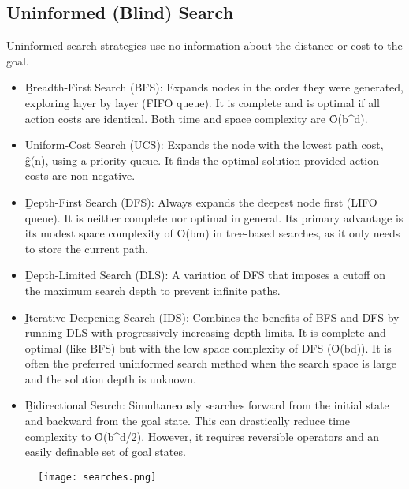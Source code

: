 \subsection{Uninformed (Blind) Search}
Uninformed search strategies use no information about the distance or cost to the goal.
\begin{itemize}
     \item \b{Breadth-First Search (BFS):} Expands nodes in the order they were generated, exploring layer by layer (FIFO queue). It is complete and is optimal if all action costs are identical. Both time and space complexity are \f{O(b^d)}.
     \item \b{Uniform-Cost Search (UCS):} Expands the node with the lowest path cost, \f{g(n)}, using a priority queue. It finds the optimal solution provided action costs are non-negative.
     \item \b{Depth-First Search (DFS):} Always expands the deepest node first (LIFO queue). It is neither complete nor optimal in general. Its primary advantage is its modest space complexity of \f{O(bm)} in tree-based searches, as it only needs to store the current path.
     \item \b{Depth-Limited Search (DLS):} A variation of DFS that imposes a cutoff on the maximum search depth to prevent infinite paths.
     \item \b{Iterative Deepening Search (IDS):} Combines the benefits of BFS and DFS by running DLS with progressively increasing depth limits. It is complete and optimal (like BFS) but with the low space complexity of DFS (\f{O(bd)}). It is often the preferred uninformed search method when the search space is large and the solution depth is unknown.
     \item \b{Bidirectional Search:} Simultaneously searches forward from the initial state and backward from the goal state. This can drastically reduce time complexity to \f{O(b^{d/2})}. However, it requires reversible operators and an easily definable set of goal states.
\end{itemize}
\vspace{0.5cm}
\begin{figure}[h!]
    \centering
    \texttt{[image: searches.png]}
\end{figure}